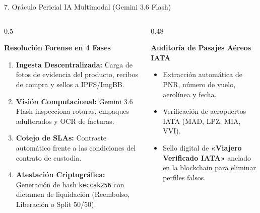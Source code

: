 \documentclass[10pt,aspectratio=169]{beamer}
\begin{document}
\begin{frame}{7. Oráculo Pericial IA Multimodal (Gemini 3.6 Flash)}
  \begin{columns}[T]
    \begin{column}{0.5\textwidth}
      \begin{block}{\textbf{Resolución Forense en 4 Fases}}
        \begin{enumerate}
          \item \textbf{Ingesta Descentralizada:} Carga de fotos de evidencia del producto, recibos de compra y sellos a IPFS/ImgBB.
          \item \textbf{Visión Computacional:} Gemini 3.6 Flash inspecciona roturas, empaques adulterados y OCR de facturas.
          \item \textbf{Cotejo de SLAs:} Contraste automático frente a las condiciones del contrato de custodia.
          \item \textbf{Atestación Criptográfica:} Generación de hash \texttt{keccak256} con dictamen de liquidación (Reembolso, Liberación o Split 50/50).
        \end{enumerate}
      \end{block}
    \end{column}
    \begin{column}{0.48\textwidth}
      \begin{exampleblock}{\textbf{Auditoría de Pasajes Aéreos IATA}}
        \begin{itemize}
          \item Extracción automática de PNR, número de vuelo, aerolínea y fecha.
          \item Verificación de aeropuertos IATA (MAD, LPZ, MIA, VVI).
          \item Sello digital de \textbf{«Viajero Verificado IATA»} anclado en la blockchain para eliminar perfiles falsos.
        \end{itemize}
      \end{exampleblock}
    \end{column}
  \end{columns}
\end{frame}
\end{document}
